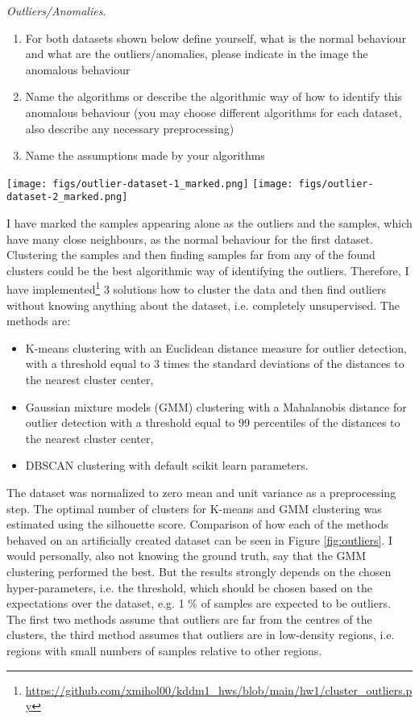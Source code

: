 \documentclass[a4paper,10pt]{article}\setlength{\textheight}{10in}\setlength{\textwidth}{6.5in}\setlength{\topmargin}{-0.125in}\setlength{\oddsidemargin}{-.2in}\setlength{\evensidemargin}{-.2in}\setlength{\headsep}{0.2in}\setlength{\footskip}{0pt}\usepackage{amsmath}\usepackage{fancyhdr}\usepackage{enumitem}\usepackage{hyperref}\usepackage{xcolor}\usepackage{graphicx}\pagestyle{fancy}
\begin{document}
\begin{enumerate}[topsep=0mm, partopsep=0mm, leftmargin=*]
{\color{blue}
\newpage\item \textit{Outliers/Anomalies}. 
\begin{enumerate}
\item For both datasets shown below define yourself, what is the normal behaviour and what are the outliers/anomalies, please indicate in the image the anomalous behaviour
\item Name the algorithms or describe the algorithmic way of how to identify this anomalous behaviour (you may choose different algorithms for each dataset, also describe any necessary preprocessing)
\item Name the assumptions made by your algorithms
\end{enumerate}
\begin{center}
 \texttt{[image: figs/outlier-dataset-1\_marked.png]}
 \hspace{2cm}
 \texttt{[image: figs/outlier-dataset-2\_marked.png]}
\end{center}
}

I have marked the samples appearing alone as the outliers and the samples, which have many close neighbours, as the normal behaviour for the first dataset. Clustering the samples and then finding samples far from any of the found clusters could be the best algorithmic way of identifying the outliers. Therefore, I have implemented\footnote{\url{https://github.com/xmihol00/kddm1_hws/blob/main/hw1/cluster_outliers.py}} 3 solutions how to cluster the data and then find outliers without knowing anything about the dataset, i.e. completely unsupervised. The methods are: 
\begin{itemize}
    \item K-means clustering with an Euclidean distance measure for outlier detection, with a threshold equal to 3 times the standard deviations of the distances to the nearest cluster center,
    \item Gaussian mixture models (GMM) clustering with a Mahalanobis distance for outlier detection with a threshold equal to 99 percentiles of the distances to the nearest cluster center,
    \item DBSCAN clustering with default scikit learn parameters.
\end{itemize}
The dataset was normalized to zero mean and unit variance as a preprocessing step. The optimal number of clusters for K-means and GMM clustering was estimated using the silhouette score. Comparison of how each of the methods behaved on an artificially created dataset can be seen in Figure \ref{fig:outliers}. I would personally, also not knowing the ground truth, say that the GMM clustering performed the best. But the results strongly depends on the chosen hyper-parameters, i.e. the threshold, which should be chosen based on the expectations over the dataset, e.g. 1 \% of samples are expected to be outliers. The first two methods assume that outliers are far from the centres of the clusters, the third method assumes that outliers are in low-density regions, i.e. regions with small numbers of samples relative to other regions.


\end{enumerate}
\end{document}
